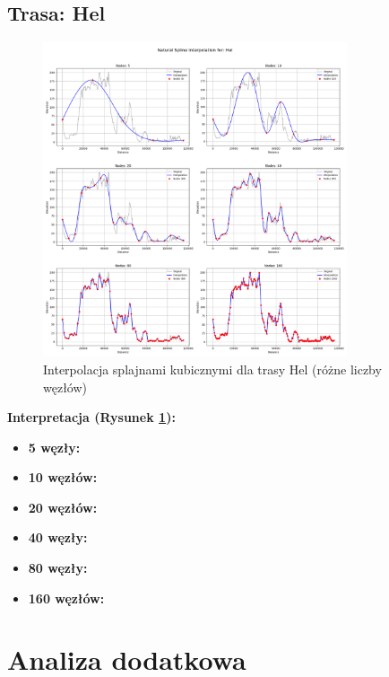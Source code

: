 \documentclass[11pt,a4paper]{article}
\begin{document}
\subsection{Trasa: Hel}
\begin{figure}[H]
    \centering
    \includegraphics[width=0.8\textwidth]{plots/Hel_Spline_basic.png}
    \caption{Interpolacja splajnami kubicznymi dla trasy Hel (różne liczby węzłów)}
    \label{fig:hej_splajny}
\end{figure}
\textbf{Interpretacja (Rysunek \ref{fig:hej_splajny}):} 
\begin{itemize}
    \item \textbf{5 węzły:}
    \item \textbf{10 węzłów:}
    \item \textbf{20 węzłów:}
    \item \textbf{40 węzły:} 
    \item \textbf{80 węzły:} 
    \item \textbf{160 węzłów:} 
\end{itemize}

\section{Analiza dodatkowa}
\end{document}
